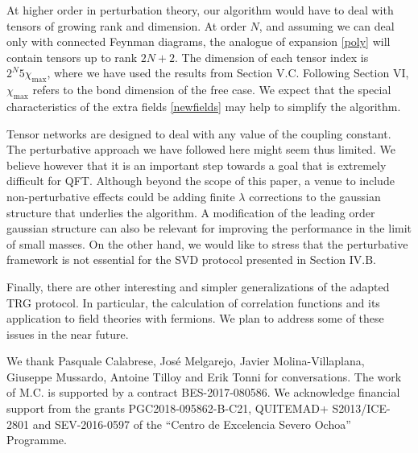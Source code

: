 \documentclass[a4paper,preprintnumbers,nofootinbib,twocolumn]{quantumarticle}
\begin{document}
At higher order in perturbation theory, our algorithm would have to deal with tensors of growing rank and dimension. At order $N$, and assuming we can deal only with connected Feynman diagrams, the analogue of expansion \eqref{poly} will contain tensors up to rank $2N+2$. 
The dimension of each tensor index is $2^{N} 5 \chi_{\text{max}}$, where we have used the results from Section V.C.
Following Section VI, $\chi_{\text{max}}$ refers to the bond dimension of the free case.
We expect that the special characteristics of the extra fields \eqref{newfields} may help to simplify the algorithm.



Tensor networks are designed to deal with any value of the coupling constant. The perturbative approach we have followed here might seem thus limited.
We believe however that it is an important step towards a goal that is extremely difficult for QFT. 
Although beyond the scope of this paper, a venue to include non-perturbative effects could be adding finite $\lambda$ corrections to the gaussian structure 
that underlies the algorithm.
A modification of the leading order gaussian structure can also be relevant for improving the performance in the limit of small masses.
On the other hand, we would like to stress that the perturbative framework is not essential for the SVD protocol presented in Section IV.B.


Finally, there are other interesting and simpler generalizations of the adapted TRG protocol. In particular, the calculation of correlation
functions and its application to field theories with fermions. We plan to address some of these issues in the near future.

\begin{acknowledgments}

We thank Pasquale Calabrese, Jos\'e Melgarejo, Javier Molina-Villaplana, Giuseppe Mussardo, Antoine Tilloy  and Erik Tonni for conversations.
The work of M.C. is supported by a contract BES-2017-080586.
We acknowledge  financial support from the grants 
PGC2018-095862-B-C21, QUITEMAD+ S2013/ICE-2801 and SEV-2016-0597 of the ``Centro de Excelencia Severo Ochoa'' Programme.

\end{acknowledgments}
\end{document}
